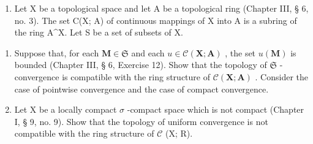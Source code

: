 \begin{enumerate}
\def\labelenumi{\arabic{enumi})}
\setcounter{enumi}{11}
\tightlist
\item
  Let X be a topological space and let A be a topological ring (Chapter III, § 6, no. 3). The set C(X; A) of continuous mappings of X into A is a subring of the ring A\^{}X. Let S be a set of subsets of X.
\end{enumerate}

\begin{enumerate}
\def\labelenumi{\alph{enumi})}
\item
  Suppose that, for each \(\mathbf{M} \in \mathfrak{S}\) and each \(u \in \mathcal{C}(\mathbf{X}; \mathbf{A})\) , the set \(u(\mathbf{M})\) is bounded (Chapter III, § 6, Exercise 12). Show that the topology of \(\mathfrak{S}\) -convergence is compatible with the ring structure of \(\mathcal{C}(\mathbf{X}; \mathbf{A})\) . Consider the case of pointwise convergence and the case of compact convergence.
\item
  Let X be a locally compact \(\sigma\) -compact space which is not compact (Chapter I, § 9, no. 9). Show that the topology of uniform convergence is not compatible with the ring structure of \(\mathcal{C}\) (X; R).
\end{enumerate}

